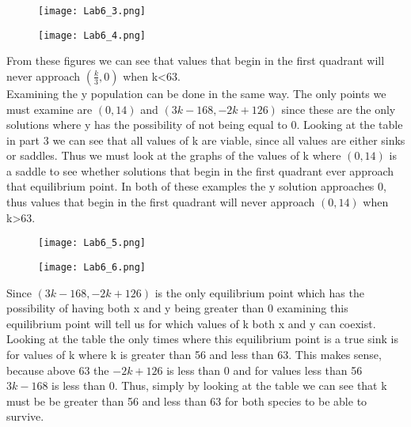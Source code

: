 \documentclass[english]{article}
\begin{document}
\begin{flushleft}
\begin{figure}[H]
\centering
\begin{minipage}{.5\textwidth}
  \centering
  \texttt{[image: Lab6\_3.png]}
  \label{fig:test1}
\end{minipage}%
\begin{minipage}{.5\textwidth}
  \centering
  \texttt{[image: Lab6\_4.png]}
  \label{fig:test2}
\end{minipage}
\end{figure}
From these figures we can see that values that begin in the first quadrant will never approach $(\frac{k}{3},0)$ when k<63.\\
Examining the y population can be done in the same way. The only points we must examine are $(0,14)$ and $(3k-168,-2k+126)$ since these are the only solutions where y has the possibility of not being equal to 0. Looking at the table in part 3 we can see that all values of k are viable, since all values are either sinks or saddles. Thus we must look at the graphs of the values of k where $(0,14)$ is a saddle to see whether solutions that begin in the first quadrant ever approach that equilibrium point. In both of these examples the y solution approaches 0, thus values that begin in the first quadrant will never approach $(0,14)$ when k>63.
\begin{figure}[H]
\centering
\begin{minipage}{.5\textwidth}
  \centering
  \texttt{[image: Lab6\_5.png]}
  \label{fig:test1}
\end{minipage}%
\begin{minipage}{.5\textwidth}
  \centering
  \texttt{[image: Lab6\_6.png]}
  \label{fig:test2}
\end{minipage}
\end{figure}
Since $(3k-168,-2k+126)$ is the only equilibrium point which has the possibility of having both x and y being greater than 0 examining this equilibrium point will tell us for which values of k both x and y can coexist. Looking at the table the only times where this equilibrium point is a true sink is for values of k where k is greater than 56 and less than 63. This makes sense, because above 63 the $-2k+126$ is less than 0 and for values less than 56 $3k-168$ is less than 0. Thus, simply by looking at the table we can see that k must be be greater than 56 and less than 63 for both species to be able to survive. 
\end{flushleft}
\end{document}
